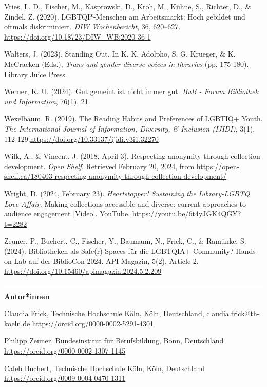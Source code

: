 \documentclass[a4paper,
fontsize=11pt,
oneside,
numbers=noperiodatend,
parskip=half-,
bibliography=totoc,
final
]{scrartcl}
\begin{document}
Vries, L. D., Fischer, M., Kasprowski, D., Kroh, M., Kühne, S., Richter,
D., \& Zindel, Z. (2020). LGBTQI*-Menschen am Arbeitsmarkt: Hoch
gebildet und oftmals diskriminiert. \emph{DIW Wochenbericht}, 36,
620--627. \url{https://doi.org/10.18723/DIW_WB:2020-36-1}

Walters, J. (2023). Standing Out. In K. K. Adolpho, S. G. Krueger, \& K.
McCracken (Eds.), \emph{Trans and gender diverse voices in libraries}
(pp. 175-180). Library Juice Press.

Werner, K. U. (2024). Gut gemeint ist nicht immer gut. \emph{BuB - Forum
Bibliothek und Information}, 76(1), 21.

Wexelbaum, R. (2019). The Reading Habits and Preferences of LGBTIQ+
Youth. \emph{The International Journal of Information, Diversity, \&
Inclusion (IJIDI)}, 3(1),
112-129.\url{https://doi.org/10.33137/ijidi.v3i1.32270}

Wilk, A., \& Vincent, J. (2018, April 3). Respecting anonymity through
collection development. \emph{Open Shelf}. Retrieved February 20, 2024,
from
\url{https://open-shelf.ca/180403-respecting-anonymity-through-collection-development/}

Wright, D. (2024, February 23). \emph{Heartstopper! Sustaining the
Library-LGBTQ Love Affair.} Making collections accessible and diverse:
current approaches to audience engagement {[}Video{]}. YouTube.
\url{https://youtu.be/6t4yJGK4QGY?t=2282}

Zeuner, P., Buchert, C., Fischer, Y., Baumann, N., Frick, C., \&
Ramünke, S. (2024). Bibliotheken als Safe(r) Spaces für die LGBTQIA+
Community? Hands-on Lab auf der BiblioCon 2024. API Magazin, 5(2),
Article 2. \url{https://doi.org/10.15460/apimagazin.2024.5.2.209}

\begin{center}\rule{0.5\linewidth}{0.5pt}\end{center}

\textbf{Autor*innen}

Claudia Frick, Technische Hochschule Köln, Köln, Deutschland, claudia.frick@th-koeln.de\newline
\url{https://orcid.org/0000-0002-5291-4301}

Philipp Zeuner, Bundesinstitut für Berufsbildung, Bonn, Deutschland\newline
\url{https://orcid.org/0000-0002-1307-1145}

Caleb Buchert, Technische Hochschule Köln, Köln, Deutschland\newline
\url{https://orcid.org/0009-0004-0470-1311}
\end{document}
